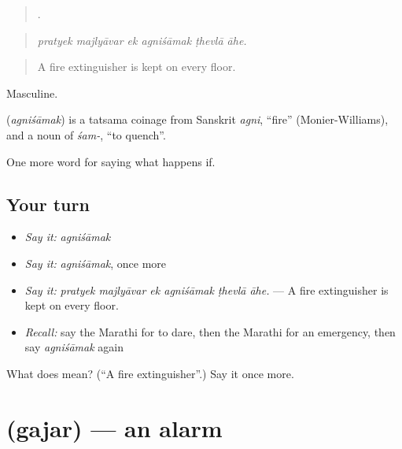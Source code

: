 \begin{quote}
     .
\end{quote}

\begin{quote}
\emph{pratyek majlyāvar ek agniśāmak ṭhevlā āhe.}
\end{quote}

\begin{quote}
A fire extinguisher is kept on every floor.
\end{quote}

Masculine.

\begin{cousinweb}
\textbf{} (\emph{agniśāmak}) is a tatsama coinage from Sanskrit \emph{agni}, \textquotedblleft{}fire\textquotedblright{} (Monier-Williams), and a noun of \emph{śam-}, \textquotedblleft{}to quench\textquotedblright{}.
\end{cousinweb}

\begin{grammarlens}[title={What you've built}]
One more word for saying what happens if.
\end{grammarlens}

\subsection*{Your turn}
\begin{itemize}
\raggedright
  \item \emph{Say it:} \emph{agniśāmak}
  \item \emph{Say it:} \emph{agniśāmak}, once more
  \item \emph{Say it:} \emph{pratyek majlyāvar ek agniśāmak ṭhevlā āhe.} — A fire extinguisher is kept on every floor.
  \item \emph{Recall:} say the Marathi for to dare, then the Marathi for an emergency, then say \emph{agniśāmak} again
\end{itemize}

\begin{tcolorbox}[breakable,colback=teal!4,colframe=teal!35!black,title={Before you move on}]
What does  mean? (\textquotedblleft{}A fire extinguisher\textquotedblright{}.) Say it once more.
\end{tcolorbox}
\section[\texorpdfstring{\mr{गजर} (gajar)}{गजर (gajar)}]{ (gajar) — an alarm}

